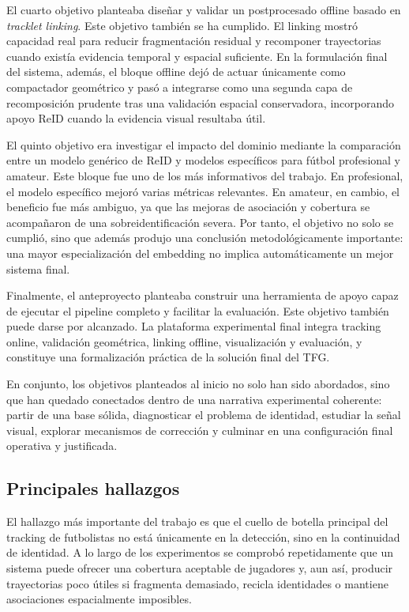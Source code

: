 \documentclass[../MAIN.tex]{subfiles}
\begin{document}
	El cuarto objetivo planteaba diseñar y validar un postprocesado offline basado en \textit{tracklet linking}. Este objetivo también se ha cumplido. El linking mostró capacidad real para reducir fragmentación residual y recomponer trayectorias cuando existía evidencia temporal y espacial suficiente. En la formulación final del sistema, además, el bloque offline dejó de actuar únicamente como compactador geométrico y pasó a integrarse como una segunda capa de recomposición prudente tras una validación espacial conservadora, incorporando apoyo ReID cuando la evidencia visual resultaba útil.
	
	El quinto objetivo era investigar el impacto del dominio mediante la comparación entre un modelo genérico de ReID y modelos específicos para fútbol profesional y amateur. Este bloque fue uno de los más informativos del trabajo. En profesional, el modelo específico mejoró varias métricas relevantes. En amateur, en cambio, el beneficio fue más ambiguo, ya que las mejoras de asociación y cobertura se acompañaron de una sobreidentificación severa. Por tanto, el objetivo no solo se cumplió, sino que además produjo una conclusión metodológicamente importante: una mayor especialización del embedding no implica automáticamente un mejor sistema final.
	
	Finalmente, el anteproyecto planteaba construir una herramienta de apoyo capaz de ejecutar el pipeline completo y facilitar la evaluación. Este objetivo también puede darse por alcanzado. La plataforma experimental final integra tracking online, validación geométrica, linking offline, visualización y evaluación, y constituye una formalización práctica de la solución final del TFG.
	
	En conjunto, los objetivos planteados al inicio no solo han sido abordados, sino que han quedado conectados dentro de una narrativa experimental coherente: partir de una base sólida, diagnosticar el problema de identidad, estudiar la señal visual, explorar mecanismos de corrección y culminar en una configuración final operativa y justificada.
	
	\subsection{Principales hallazgos}
	
	El hallazgo más importante del trabajo es que el cuello de botella principal del tracking de futbolistas no está únicamente en la detección, sino en la continuidad de identidad. A lo largo de los experimentos se comprobó repetidamente que un sistema puede ofrecer una cobertura aceptable de jugadores y, aun así, producir trayectorias poco útiles si fragmenta demasiado, recicla identidades o mantiene asociaciones espacialmente imposibles.
	
\end{document}
